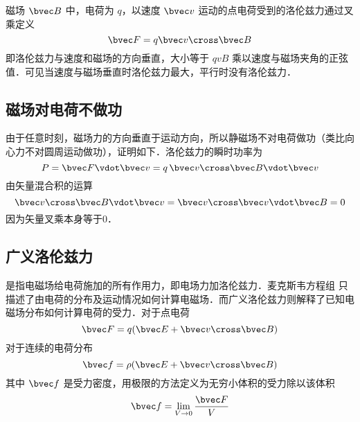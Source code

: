 
磁场 $\bvec B$ 中，电荷为 $q$，以速度 $\bvec v$ 运动的点电荷受到的洛伦兹力通过叉乘定义
\begin{equation}
\bvec F = q\bvec v \cross \bvec B
\end{equation}
即洛伦兹力与速度和磁场的方向垂直，大小等于 $qvB$ 乘以速度与磁场夹角的正弦值．可见当速度与磁场垂直时洛伦兹力最大，平行时没有洛伦兹力．

\subsection{磁场对电荷不做功}
由于任意时刻，磁场力的方向垂直于运动方向，所以静磁场不对电荷做功（类比向心力不对圆周运动做功），证明如下．洛伦兹力的瞬时功率为
\begin{equation}
P = \bvec F \vdot \bvec v = q\,\bvec v \cross \bvec B \vdot \bvec v
\end{equation}
由矢量混合积的运算 %
\begin{equation}
\bvec v \cross \bvec B \vdot \bvec v = \bvec v \cross \bvec v \vdot \bvec B = 0
\end{equation}
因为矢量叉乘本身等于0．


\subsection{广义洛伦兹力}
 是指电磁场给电荷施加的所有作用力，即电场力加洛伦兹力．麦克斯韦方程组%
只描述了由电荷的分布及运动情况如何计算电磁场．而广义洛伦兹力则解释了已知电磁场分布如何计算电荷的受力．对于点电荷
\begin{equation}
\bvec F = q (\bvec E + \bvec v \cross \bvec B)
\end{equation}
对于连续的电荷分布
\begin{equation}
\bvec f = \rho(\bvec E + \bvec v \cross \bvec B)
\end{equation}
其中 $\bvec f$ 是受力密度，用极限的方法定义为无穷小体积的受力除以该体积
\begin{equation}
\bvec f = \lim_{V \to 0} \frac{\bvec F}{V}
\end{equation}

